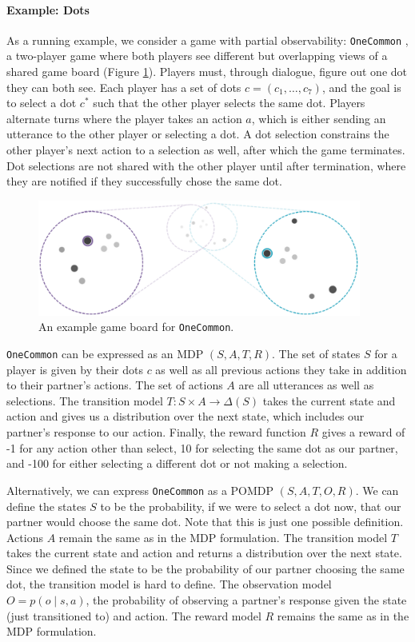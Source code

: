 \documentclass[11pt]{article}
\begin{document}
\paragraph{Example: Dots}
As a running example, we consider a game with partial observability:
\texttt{OneCommon} \citet{onecommon},
a two-player game where both players see different but overlapping
views of a shared game board (Figure \ref{fig:oc}).
Players must, through dialogue, figure out one dot they can both see.
Each player has a set of dots $c = (c_1,\ldots, c_7)$, and the goal is to
select a dot $c^*$ such that the other player selects the same dot.
Players alternate turns
where the player takes an action $a$,
which is either sending an utterance to the other player or selecting a dot.
A dot selection constrains the other player's next action to a selection as well,
after which the game terminates.
Dot selections are not shared with the other player until after termination,
where they are notified if they successfully chose the same dot.
\begin{figure}[h]
\centering
\includegraphics[height=1.5in]{img/oc.png}
\caption{
\label{fig:oc}
An example game board for \texttt{OneCommon}.
}
\end{figure}

\texttt{OneCommon} can be expressed as an MDP $(S,A,T,R)$.
The set of states $S$ for a player is given by their dots $c$ as well as all previous actions
they take in addition to their partner's actions.
The set of actions $A$ are all utterances as well as selections.
The transition model $T: S \times A \to \Delta(S)$ takes the current state and action
and gives us a distribution over the next state,
which includes our partner's response to our action.
Finally, the reward function $R$ gives a reward of -1 for any action other than
select, 10 for selecting the same dot as our partner, and -100 for either
selecting a different dot or not making a selection.

Alternatively, we can express \texttt{OneCommon} as a POMDP $(S,A,T,O,R)$.
We can define the states $S$ to be the probability, if we were to select a dot now,
that our partner would choose the same dot.
Note that this is just one possible definition.
Actions $A$ remain the same as in the MDP formulation.
The transition model $T$ takes the current state and action and returns a distribution over
the next state.
Since we defined the state to be the probability of our partner choosing the same dot,
the transition model is hard to define.
The observation model $O = p(o \mid s, a)$, the probability of observing a partner's
response given the state (just transitioned to) and action.
The reward model $R$ remains the same as in the MDP formulation.
\end{document}
